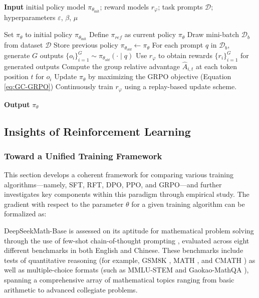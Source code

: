 \begin{itemize}[topsep=0pt]
\begin{algorithm}[t]
  \small
  \caption{Iterative Group Relative Policy Optimization}
  \textbf{Input} initial policy model $\pi_{\theta_{\text{init}}}$; reward models $r_\varphi$; task prompts $\mathcal{D}$; 
  hyperparameters $\varepsilon$, $\beta$, $\mu$
  \begin{algorithmic}[1]
    \State Set $\pi_\theta$ to initial policy $\pi_{\theta_{\text{init}}}$
       \State Define $\pi_{ref}$ as current policy $\pi_{\theta}$
      \State Draw mini-batch $\mathcal{D}_b$ from dataset $\mathcal{D}$
      \State Store previous policy $\pi_{\theta_{old}} \leftarrow \pi_{\theta}$ 
      \State For each prompt $q$ in $\mathcal{D}_b$, generate $G$ outputs $\{o_i\}_{i=1}^G \sim \pi_{\theta_{old}} (\cdot \mid q)$
      \State Use $r_{\varphi}$ to obtain rewards $\{r_i\}_{i=1}^G$ for generated outputs
      \State Compute the group relative advantage $\hat{A}_{i,t}$ at each token position $t$ for $o_i$
        \State Update $\pi_\theta$ by maximizing the GRPO objective (Equation \ref{eq:GC-GRPO})
      \EndFor
    \EndFor \State Continuously train $r_\varphi$ using a replay-based update scheme.
    \EndFor 
  \end{algorithmic}
  \textbf{Output} $\pi_\theta$
  \label{alg:iter-grpo}
\end{algorithm}

\subsection{Insights of Reinforcement Learning}
\subsubsection{Toward a Unified Training Framework} This section develops a coherent framework for comparing various training algorithms—namely, SFT, RFT, DPO, PPO, and GRPO—and further investigates key components within this paradigm through empirical study. The gradient with respect to the parameter $\theta$ for a given training algorithm can be formalized as:

DeepSeekMath-Base is assessed on its aptitude for mathematical problem solving through the use of few-shot chain-of-thought prompting \citep{cot}, evaluated across eight different benchmarks in both English and Chinese. These benchmarks include tests of quantitative reasoning (for example, GSM8K \citep{gsm8k}, MATH \citep{MATH}, and CMATH \citep{wei2023cmath}) as well as multiple-choice formats (such as MMLU-STEM \citep{mmlu} and Gaokao-MathQA \citep{agieval}), spanning a comprehensive array of mathematical topics ranging from basic arithmetic to advanced collegiate problems.


\end{itemize}
